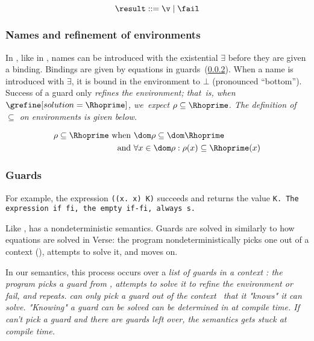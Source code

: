\documentclass[manuscript,screen,review, 12pt, nonacm]{acmart}
\begin{document}
    \[\result\; \rm{::=}\; \v\; \vert \; \fail \]
    

    \subsubsection{Names and refinement of environments}

    In \VMinus, like in \VC, names can be introduced with the existential
    {$\exists$} before they are given a binding. Bindings are given by equations
    in guards~(\ref{guards}). When a name is introduced with {$\exists$}, it is
    bound in the environment \Rho to $\bot$ (pronounced “bottom”). Success of a
    guard only \it{refines} the environment; that~is, when
    $\grefine[solution=\Rhoprime]$, we~expect $\rho \subseteq \Rhoprime$. The
    definition of $\subseteq$ on environments is given below. 
    
    \begin{align*}
    \rho \subseteq \Rhoprime \text{ when }&\dom\rho  \subseteq \dom \Rhoprime\\
    \text{ and } &\forall x \in \dom \rho: \rho(x) \subseteq \Rhoprime(x)
    \end{align*}
    
    \medskip
        
    \subsubsection{Guards}
    \label{guards}

    For example, the \VMinus expression {\tt{((}\ttbackslash\tt{x. x) K)}}
    succeeds and returns the value \tt{K}. The \VMinus expression \tt{if  fi},
    the empty \tt{if-fi}, always {\fail}s. 

    Like \VC, \VMinus has a nondeterministic semantics. Guards are solved in \VMinus
    similarly to how equations are solved in Verse: the program nondeterministically
    picks one out of a context (\context), attempts to solve it, and moves on. 

In our semantics, this process occurs over a \it{list} of guards \gs in a
context \context: the program picks a guard from \context, attempts to solve it
to refine the environment or fail, and repeats. \VMinus can only pick a guard
out of the context \context\ that it "knows" it can solve. "Knowing" a guard can
be solved can be determined in \VMinus at compile time. If \VMinus can't pick a
guard and there are guards left over, the semantics gets stuck at compile time. 
\end{document}
